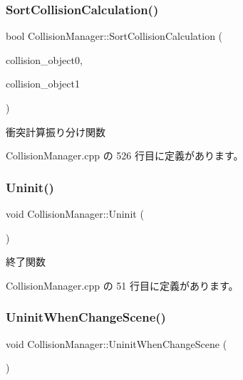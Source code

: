 \subsubsection{\texorpdfstring{Sort\+Collision\+Calculation()}{SortCollisionCalculation()}}
{\footnotesize\ttfamily bool Collision\+Manager\+::\+Sort\+Collision\+Calculation (\begin{DoxyParamCaption}\item[{\mbox{\hyperlink{class_collision_object}{Collision\+Object}} $\ast$}]{collision\+\_\+object0,  }\item[{\mbox{\hyperlink{class_collision_object}{Collision\+Object}} $\ast$}]{collision\+\_\+object1 }\end{DoxyParamCaption})\hspace{0.3cm}{\ttfamily [private]}}



衝突計算振り分け関数 



 Collision\+Manager.\+cpp の 526 行目に定義があります。

\mbox{\label{class_collision_manager_abfa4b87f3ce102f0d173e112e7963f09}} 
\subsubsection{\texorpdfstring{Uninit()}{Uninit()}}
{\footnotesize\ttfamily void Collision\+Manager\+::\+Uninit (\begin{DoxyParamCaption}{ }\end{DoxyParamCaption})}



終了関数 



 Collision\+Manager.\+cpp の 51 行目に定義があります。

\mbox{\label{class_collision_manager_a33ce56b5a6f68d71b0f2bf733413dddb}} 
\subsubsection{\texorpdfstring{Uninit\+When\+Change\+Scene()}{UninitWhenChangeScene()}}
{\footnotesize\ttfamily void Collision\+Manager\+::\+Uninit\+When\+Change\+Scene (\begin{DoxyParamCaption}{ }\end{DoxyParamCaption})}



